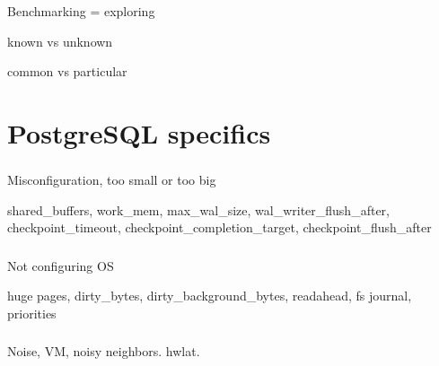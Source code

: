 \documentclass[usenames,dvipsnames, 18pt, compress, aspectratio=169]{beamer}
\begin{document}
\begin{frame}
    \frametitle{}
    \begin{center}
        Benchmarking = exploring

        known vs unknown

        common vs particular
    \end{center}
\end{frame}

\section{PostgreSQL specifics}

\begin{frame}
    \frametitle{}
    \begin{center}
        Misconfiguration, too small or too big

        shared\_buffers, work\_mem, max\_wal\_size, wal\_writer\_flush\_after, checkpoint\_timeout, checkpoint\_completion\_target, checkpoint\_flush\_after
    \end{center}
\end{frame}

\begin{frame}
    \frametitle{}
    \begin{center}
        Not configuring OS

        huge pages, dirty\_bytes, dirty\_background\_bytes, readahead, fs journal, priorities
    \end{center}
\end{frame}

\begin{frame}
    \frametitle{}
    \begin{center}
        Noise, VM, noisy neighbors. hwlat.
    \end{center}
\end{frame}
\end{document}
